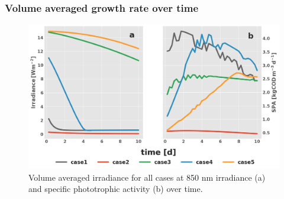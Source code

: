 \subsubsection{Volume averaged growth rate over time}
\begin{figure}[H]
    \centering
    \includegraphics[width=\textwidth,height=0.3\textheight]{Chap4/results/post_processing/2D_cases/vol_averaged.png}
    \caption{Volume averaged irradiance for all cases at 850 nm irradiance (a) and specific phototrophic activity (b) over time.} 
    \label{fig:vol_averaged}
\end{figure}


